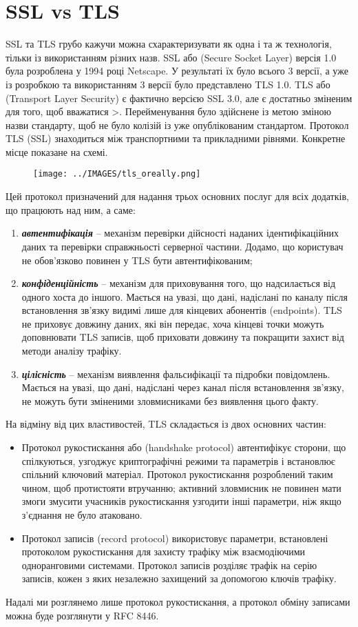 \section{SSL vs TLS}
SSL та TLS грубо кажучи можна схарактеризувати як одна і та ж технологія, тільки із використанням різних назв. SSL або (Secure Socket Layer) версія 1.0 була розроблена у 1994 році Netscape. У результаті їх було всього 3 версії, а уже із розробкою та використанням 3 версії було представлено TLS 1.0. TLS або (Transport Layer Security) є фактично версією SSL 3.0, але є достатньо зміненим для того, щоб вважатися >. Перейменування було здійснене із метою зміною назви стандарту, щоб не було колізій із уже опублікованим стандартом.
Протокол TLS (SSL) знаходиться між транспортними та прикладними рівнями. Конкретне місце показане на схемі.
\begin{figure}[ht]
        \centering
        \texttt{[image: ../IMAGES/tls\_oreally.png]}
        \label{tls_oreally}
\end{figure}
Цей протокол призначений для надання трьох основних послуг для всіх додатків, що працюють над ним, а саме:
\begin{enumerate}
    \item \textbf{\textit{автентифікація}} -- механізм перевірки дійсності наданих ідентифікаційних даних та перевірки справжньості серверної частини. Додамо, що користувач не обов'язково повинен у TLS бути автентифікованим;
    \item \textbf{\textit{конфіденційність}} -- механізм для приховування того, що надсилається від одного хоста до іншого. Мається на увазі, що дані, надіслані по каналу після встановлення зв'язку видимі лише для кінцевих абонентів (endpoints). TLS не приховує довжину даних, які він передає, хоча кінцеві точки можуть доповнювати TLS записів, щоб приховати довжину та покращити захист від методи аналізу трафіку.
    \item \textbf{\textit{цілісність}} -- механізм виявлення фальсифікації та підробки повідомлень. Мається на увазі, що дані, надіслані через канал після встановлення зв'язку, не можуть бути зміненими зловмисниками без виявлення цього факту.
\end{enumerate}
На відміну від цих властивостей, TLS складається із двох основних частин:
\begin{itemize}
    \item Протокол рукостискання або (handshake protocol) автентифікує сторони, що спілкуються, узгоджує криптографічні режими та параметрів і встановлює спільний ключовий матеріал. Протокол рукостискання розроблений таким чином, щоб протистояти втручанню; активний зловмисник не повинен мати змоги змусити учасників рукостискання узгодити інші параметри, ніж якщо з'єднання не було атаковано.
    \item Протокол записів (record protocol) використовує параметри, встановлені протоколом рукостискання для захисту трафіку між взаємодіючими одноранговими системами. Протокол записів розділяє трафік на серію записів, кожен з яких незалежно захищений за допомогою ключів трафіку.
\end{itemize}
Надалі ми розглянемо лише протокол рукостискання, а протокол обміну записами можна буде розглянути у RFC 8446.
